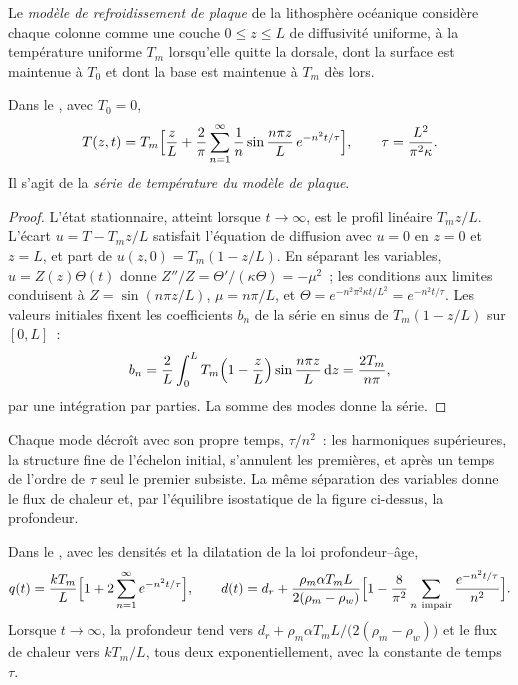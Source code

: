 \begin{definition}\label{def:b3:lithosphere-thermal-models:plate}
Le \emph{modèle de refroidissement de plaque} de la
lithosphère océanique considère chaque colonne comme une couche $0 \le z \le L$ de
diffusivité uniforme, à la température uniforme $T_m$ lorsqu'elle quitte la dorsale, dont
la surface est maintenue à $T_0$ et dont la base est maintenue à $T_m$ dès lors.
\end{definition}

\begin{theorem}\label{thm:b3:lithosphere-thermal-models:plate-series}
Dans le , avec $T_0 = 0$,
\[
  T(z, t) = T_m\Bigl[\frac zL + \frac2\pi\sum_{n=1}^\infty\frac1n
  \sin\frac{n\pi z}{L}\,e^{-n^2t/\tau}\Bigr],\qquad
  \tau = \frac{L^2}{\pi^2\kappa} .
\]
Il s'agit de la \emph{série de température du modèle de plaque}.
\end{theorem}

\begin{proof}
L'état stationnaire, atteint lorsque $t \to \infty$, est le profil linéaire $T_mz/L$.
L'écart $u = T - T_mz/L$ satisfait l'équation de diffusion avec $u = 0$ en
$z = 0$ et $z = L$, et part de $u(z, 0) = T_m(1 - z/L)$. En séparant les
variables, $u = Z(z)\Theta(t)$ donne $Z''/Z = \Theta'/(\kappa\Theta) = -\mu^2$~;
les conditions aux limites conduisent à $Z = \sin(n\pi z/L)$, $\mu = n\pi/L$, et
$\Theta = e^{-n^2\pi^2\kappa t/L^2} = e^{-n^2t/\tau}$. Les valeurs initiales fixent les
coefficients $b_n$ de la série en sinus de $T_m(1 - z/L)$ sur $[0, L]$~:
\[
  b_n = \frac2L\int_0^LT_m\Bigl(1 - \frac zL\Bigr)\sin\frac{n\pi z}{L}\,\mathrm dz
  = \frac{2T_m}{n\pi},
\]
par une intégration par parties. La somme des modes donne la série.
\end{proof}

Chaque mode décroît avec son propre temps, $\tau/n^2$~: les harmoniques supérieures, la
structure fine de l'échelon initial, s'annulent les premières, et après un temps
de l'ordre de $\tau$ seul le premier subsiste. La même séparation des variables donne le
flux de chaleur et, par l'équilibre isostatique de la figure ci-dessus, la profondeur.

\begin{proposition}\label{prop:b3:lithosphere-thermal-models:plate-depth}
Dans le , avec les densités et la dilatation de la
loi profondeur--âge,
\[
  q(t) = \frac{kT_m}{L}\Bigl[1 + 2\sum_{n=1}^\infty e^{-n^2t/\tau}\Bigr],\qquad
  d(t) = d_r + \frac{\rho_m\alpha T_mL}{2(\rho_m - \rho_w)}
  \Bigl[1 - \frac{8}{\pi^2}\sum_{n\ \text{impair}}\frac{e^{-n^2t/\tau}}{n^2}\Bigr].
\]
Lorsque $t \to \infty$, la profondeur tend vers $d_r + \rho_m\alpha T_mL/\bigl(2(\rho_m -
\rho_w)\bigr)$ et le flux de chaleur vers $kT_m/L$, tous deux exponentiellement, avec la
constante de temps $\tau$.
\end{proposition}

